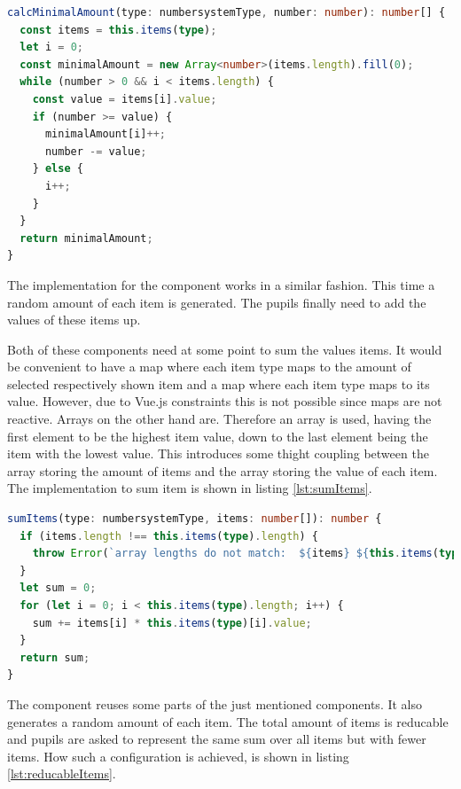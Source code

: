 \begin{lstlisting}[language=TypeScript,caption={Calculate minimal amount of items needed to reach a certain number},label={lst:calcMinimalAmount}]
calcMinimalAmount(type: numbersystemType, number: number): number[] {
  const items = this.items(type);
  let i = 0;
  const minimalAmount = new Array<number>(items.length).fill(0);
  while (number > 0 && i < items.length) {
    const value = items[i].value;
    if (number >= value) {
      minimalAmount[i]++;
      number -= value;
    } else {
      i++;
    }
  }
  return minimalAmount;
}
\end{lstlisting}

The implementation for the  component works in a similar fashion. This time a random amount of each item is generated.  The pupils finally need to add the values of these items up.

Both of these components need at some point to sum the values items. It would be convenient to have a map where each item type maps to the amount of selected respectively shown item and a map where each item type maps to its value. However, due to Vue.js constraints this is not possible since maps are not reactive. 
Arrays on the other hand are. Therefore an array is used, having the first element to be the highest item value, down to the last element being the item with the lowest value. This introduces some thight coupling between the array storing the amount of items and the array storing the value of each item. The implementation to sum item is shown in listing \ref{lst:sumItems}.

\begin{lstlisting}[language=TypeScript,caption={Sum up items},label={lst:sumItems}]
sumItems(type: numbersystemType, items: number[]): number {
  if (items.length !== this.items(type).length) {
    throw Error(`array lengths do not match:  ${items} ${this.items(type)}`);
  }
  let sum = 0;
  for (let i = 0; i < this.items(type).length; i++) {
    sum += items[i] * this.items(type)[i].value;
  }
  return sum;
}
\end{lstlisting}

The  component reuses some parts of the just mentioned components. It also generates a random amount of each item. The total amount of items is reducable and pupils are asked to represent the same sum over all items but with fewer items. How such a configuration is achieved, is shown in listing \ref{lst:reducableItems}.

